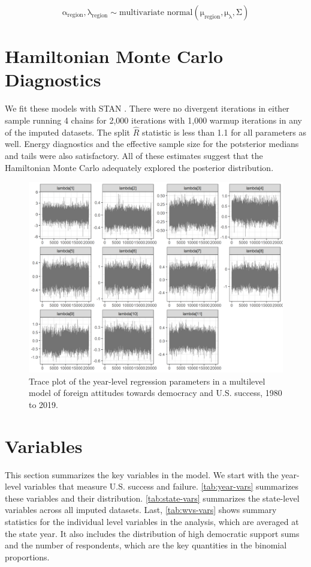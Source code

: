 \documentclass[12pt]{article}
\begin{document}
\begin{equation}
\mathrm{\alpha_{region}, \lambda_{region} \sim \mbox{multivariate normal}(\mu_{region}, \mu_{\lambda}, \Sigma)}
\end{equation}


\section{Hamiltonian Monte Carlo Diagnostics}

We fit these models with STAN \citep{Carpenteretal2016}.
There were no divergent iterations in either sample running 4 chains for 2,000 iterations with 1,000 warmup iterations in any of the imputed datasets.  
The split $\hat{R}$ statistic is less than 1.1 for all parameters as well.
Energy diagnostics and the effective sample size for the potsterior medians and tails were also satisfactory.  
All of these estimates suggest that the Hamiltonian Monte Carlo adequately explored the posterior distribution. 


\begin{figure}
\includegraphics[width = .95\textwidth]{lambda-trace.png}
\caption{Trace plot of the year-level regression parameters in a multilevel model of foreign attitudes towards democracy and U.S. success, 1980 to 2019.}
\label{fig:lambda-trace} 
\end{figure}

\section{Variables}


This section summarizes the key variables in the model. 
We start with the year-level variables that measure U.S. success and failure. 
\autoref{tab:year-vars} summarizes these variables and their distribution. 
\autoref{tab:state-vars} summarizes the state-level variables across all imputed datasets.
Last, \autoref{tab:wvs-vars} shows summary statistics for the individual level variables in the analysis, which are averaged at the state year. 
It also includes the distribution of high democratic support sums and the number of respondents, which are the key quantities in the binomial proportions.
 
\end{document}
